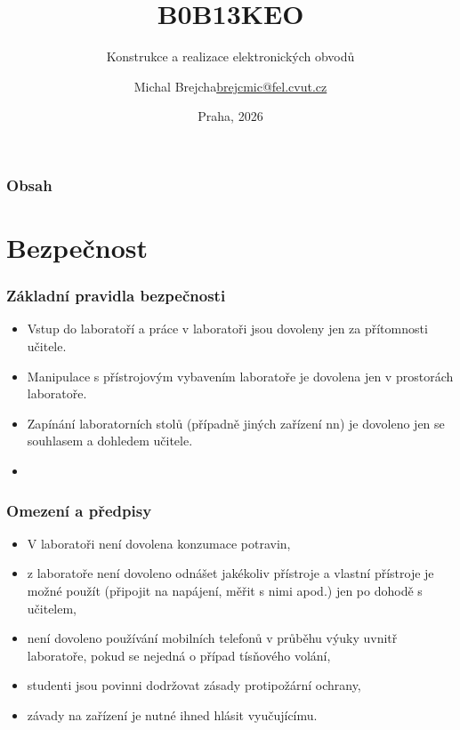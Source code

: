 \documentclass{beamer}
\title[B0B13KEO]{B0B13KEO}
\subtitle[KEO] {Konstrukce a realizace elektronických obvodů}
\author[Brejcha]{\texorpdfstring{Michal Brejcha\newline\url{brejcmic@fel.cvut.cz}}{Michal Brejcha}}
\institute[ČVUT]{ČVUT v Praze, FEL}
\date[Praha, 2026]{Praha, 2026}
\begin{document}
\frame{\titlepage}

\begin{frame}
\frametitle{Obsah} 
\tableofcontents
\end{frame}


\section{\texorpdfstring{Bezpečnost}{Bezpecnost}}
	\begin{frame}
    \frametitle{Základní pravidla bezpečnosti}
		\begin{itemize}
		\item Vstup do laboratoří a práce v laboratoři jsou dovoleny jen za přítomnosti učitele.
		\item Manipulace s přístrojovým vybavením laboratoře je dovolena jen v prostorách laboratoře.
		\item Zapínání laboratorních stolů (případně jiných zařízení nn) je dovoleno jen se souhlasem a dohledem učitele.
		\item \textbf{}
		\end{itemize}
	\end{frame}
	\begin{frame}
    \frametitle{Omezení a předpisy}
		\begin{itemize}
		\item V laboratoři není dovolena konzumace potravin,
    \item z laboratoře není dovoleno odnášet jakékoliv přístroje a vlastní přístroje je možné použít (připojit na napájení, měřit s nimi apod.) jen po dohodě s učitelem,
		\item není dovoleno používání mobilních telefonů v průběhu výuky uvnitř laboratoře, pokud se nejedná o případ tísňového volání,
		\item studenti jsou povinni dodržovat zásady protipožární ochrany,
		\item závady na zařízení je nutné ihned hlásit vyučujícímu.
		\end{itemize}
	\end{frame}
\end{document}
